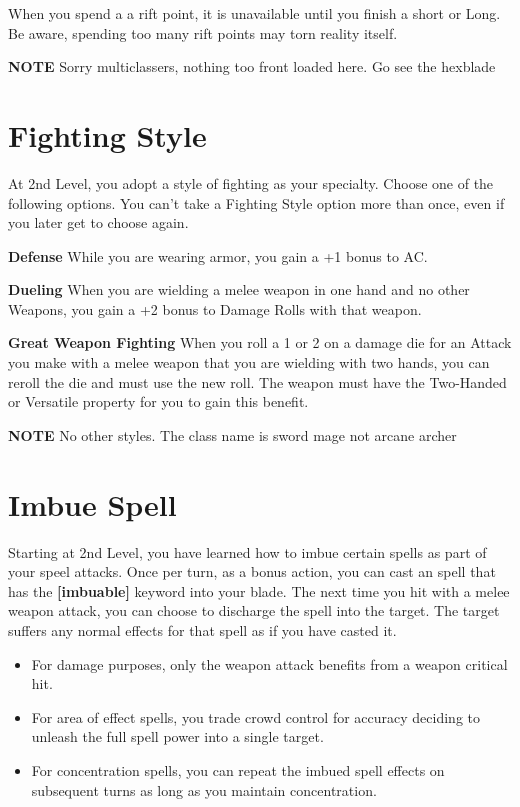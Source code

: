 \begin{multicols*}{2}
When you spend a a rift point, it is unavailable until you finish a short or Long. Be aware, spending too many rift points may torn reality itself. 

\smallskip

{\color{red} \textbf{NOTE} Sorry multiclassers, nothing too front loaded here. Go see the hexblade}
   
\section*{Fighting Style} 

At 2nd Level, you adopt a style of fighting as your specialty. Choose one of the following options. You can’t take a Fighting Style option more than once, even if you later get to choose again.

\textbf{Defense}
While you are wearing armor, you gain a +1 bonus to AC.

\textbf{Dueling}
When you are wielding a melee weapon in one hand and no other Weapons, you gain a +2 bonus to Damage Rolls with that weapon.

\textbf{Great Weapon Fighting}
When you roll a 1 or 2 on a damage die for an Attack you make with a melee weapon that you are wielding with two hands, you can reroll the die and must use the new roll. The weapon must have the Two-Handed or Versatile property for you to gain this benefit.

\smallskip

{\color{red} \textbf{NOTE} No other styles. The class name is sword mage not arcane archer }


    

\section*{Imbue Spell}

Starting at 2nd Level, you have learned how to imbue certain spells as part of your speel attacks. 
Once per turn, as a bonus action, you can cast an spell that has the \textbf{[imbuable]} keyword into your blade.
The next time you hit with a melee weapon attack, you can choose to discharge the spell into the target. 
The target suffers any normal effects for that spell as if you have casted it. 


\begin{itemize}
    \item For damage purposes, only the weapon attack benefits from a weapon critical hit.
    \item For area of effect spells, you trade crowd control for accuracy deciding to unleash the full spell power into a single target.
    \item For concentration spells, you can repeat the imbued spell effects on subsequent turns as long as you maintain concentration.
\end{itemize}





\end{multicols*}
